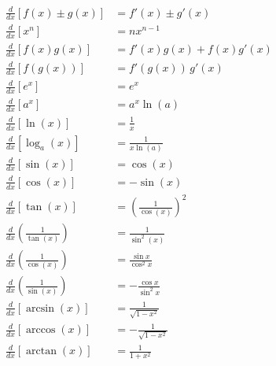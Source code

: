 \documentclass[
]{article}
\begin{document}
\begin{align*}
	\frac{d}{dx}[f(x) \pm g(x)]                & = f'(x) \pm g'(x)                                                    \\
	\frac{d}{dx}[x^n]                          & = nx^{n-1}                                                           \\
	\frac{d}{dx}[f(x)g(x)]                     & = f'(x)g(x) + f(x)g'(x)                                              \\
	\frac{d}{dx}[f(g(x))]                      & = f'(g(x))\,g'(x)                                                    \\
	\frac{d}{dx}[e^x]                          & = e^x                                                                \\
	\frac{d}{dx}[a^x]                          & = a^x \ln(a)                                                         \\
	\frac{d}{dx}[\ln(x)]                       & = \frac{1}{x}                                                        \\
	\frac{d}{dx}[\log_a(x)]                    & = \frac{1}{x \ln(a)}                                                 \\
	\frac{d}{dx}[\sin(x)]                      & = \cos(x)                                                            \\
	\frac{d}{dx}[\cos(x)]                      & = -\sin(x)                                                           \\
	\frac{d}{dx}[\tan(x)]                      & = \left(\frac{1}{\cos(x)}\right)^2                                   \\
	\frac{d}{dx}\left(\frac{1}{\tan(x)}\right) & = \frac{1}{\sin^2 (x)}                                               \\
	\frac{d}{dx}\left(\frac{1}{\cos(x)}\right) & = \frac{\sin x}{\cos^2 x}                                            \\
	\frac{d}{dx}\left(\frac{1}{\sin(x)}\right) & = -\frac{\cos x}{\sin^2 x}                                           \\
	\frac{d}{dx}[\arcsin(x)]                   & = \frac{1}{\sqrt{1 - x^2}}                                           \\
	\frac{d}{dx}[\arccos(x)]                   & = -\frac{1}{\sqrt{1 - x^2}}                                          \\
	\frac{d}{dx}[\arctan(x)]                   & = \frac{1}{1 + x^2}                                                  \\

\end{align*}
\end{document}
